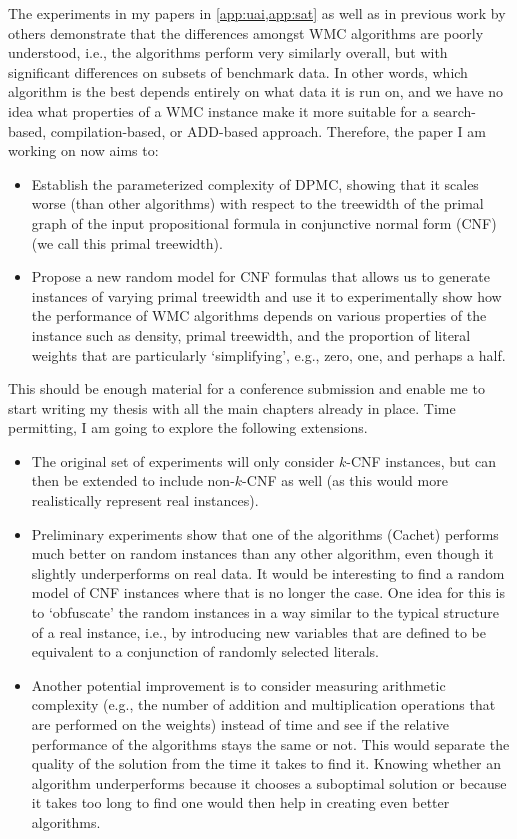 \documentclass{article}
\begin{document}
{The experiments in my papers in \cref{app:uai,app:sat} as well as in previous
work by others \cite{DBLP:conf/aaai/DudekPV20,DBLP:conf/cp/DudekPV20}
demonstrate that the differences amongst WMC algorithms are poorly understood,
i.e., the algorithms perform very similarly overall, but with significant
differences on subsets of benchmark data. In other words, which algorithm is the
best depends entirely on what data it is run on, and we have no idea what
properties of a WMC instance make it more suitable for a search-based,
compilation-based, or ADD-based approach. Therefore, the paper I am working on
now aims to:
\begin{itemize}
\item Establish the parameterized complexity of DPMC, showing that it scales
  worse (than other algorithms) with respect to the treewidth of the primal
  graph of the input propositional formula in conjunctive normal form (CNF) (we
  call this primal treewidth).
\item Propose a new random model for CNF formulas that allows us to generate
  instances of varying primal treewidth and use it to experimentally show how
  the performance of WMC algorithms depends on various properties of the
  instance such as density, primal treewidth, and the proportion of literal
  weights that are particularly `simplifying', e.g., zero, one, and perhaps a
  half.
\end{itemize}
This should be enough material for a conference submission and enable me to
start writing my thesis with all the main chapters already in place. Time
permitting, I am going to explore the following extensions.
\begin{itemize}
\item The original set of experiments will only consider $k$-CNF instances, but
  can then be extended to include non-$k$-CNF as well (as this would more
  realistically represent real instances).
\item Preliminary experiments show that one of the algorithms (Cachet) performs
  much better on random instances than any other algorithm, even though it
  slightly underperforms on real data. It would be interesting to find a random
  model of CNF instances where that is no longer the case. One idea for this is
  to `obfuscate' the random instances in a way similar to the typical structure
  of a real instance, i.e., by introducing new variables that are defined to be
  equivalent to a conjunction of randomly selected literals.
\item Another potential improvement is to consider measuring arithmetic
  complexity (e.g., the number of addition and multiplication operations that
  are performed on the weights) instead of time and see if the relative
  performance of the algorithms stays the same or not. This would separate the
  quality of the solution from the time it takes to find it. Knowing whether an
  algorithm underperforms because it chooses a suboptimal solution or because it
  takes too long to find one would then help in creating even better algorithms.
\end{itemize}

}
\end{document}
